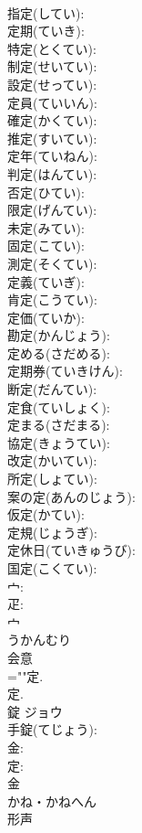 \documentclass[8pt]{extreport}
\begin{document}
\begin{CJK}{UTF8}{min}
\\	指定(してい): 
\\	定期(ていき): 
\\	特定(とくてい): 
\\	制定(せいてい): 
\\	設定(せってい): 
\\	定員(ていいん): 
\\	確定(かくてい): 
\\	推定(すいてい): 
\\	定年(ていねん): 
\\	判定(はんてい): 
\\	否定(ひてい): 
\\	限定(げんてい): 
\\	未定(みてい): 
\\	固定(こてい): 
\\	測定(そくてい): 
\\	定義(ていぎ): 
\\	肯定(こうてい): 
\\	定価(ていか): 
\\	勘定(かんじょう): 
\\	定める(さだめる): 
\\	定期券(ていきけん): 
\\	断定(だんてい): 
\\	定食(ていしょく): 
\\	定まる(さだまる): 
\\	協定(きょうてい): 
\\	改定(かいてい): 
\\	所定(しょてい): 
\\	案の定(あんのじょう): 
\\	仮定(かてい): 
\\	定規(じょうぎ): 
\\	定休日(ていきゅうび): 
\\	国定(こくてい): 
\\	宀: 
\\	疋: 
\\	宀	
\\	うかんむり	
\\	会意 
\\	=""定.
\\	定.
\\	錠	ジョウ			
\\	手錠(てじょう): 
\\	金: 
\\	定: 
\\	金	
\\	かね・かねへん	
\\	形声 

\end{CJK}
\end{document}
